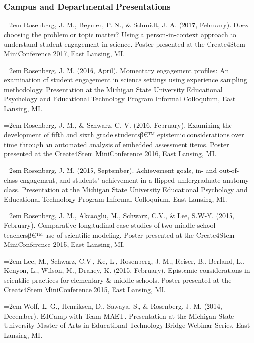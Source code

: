 \documentclass[]{article}
\newcommand{\euro}{€}
\begin{document}
\subsubsection{Campus and Departmental
Presentations}\label{campus-and-departmental-presentations}

\hangindent=2em Rosenberg, J. M., Beymer, P. N., \& Schmidt, J. A.
(2017, February). Does choosing the problem or topic matter? Using a
person-in-context approach to understand student engagement in science.
Poster presented at the Create4Stem MiniConference 2017, East Lansing,
MI.

\hangindent=2em Rosenberg, J. M. (2016, April). Momentary engagement
profiles: An examination of student engagement in science settings using
experience sampling methodology. Presentation at the Michigan State
University Educational Psychology and Educational Technology Program
Informal Colloquium, East Lansing, MI.

\hangindent=2em Rosenberg, J. M., \& Schwarz, C. V. (2016, February).
Examining the development of fifth and sixth grade studentsβ\euro{}™
epistemic considerations over time through an automated analysis of
embedded assessment items. Poster presented at the Create4Stem
MiniConference 2016, East Lansing, MI.

\hangindent=2em Rosenberg, J. M. (2015, September). Achievement goals,
in- and out-of-class engagement, and students' achievement in a flipped
undergraduate anatomy class. Presentation at the Michigan State
University Educational Psychology and Educational Technology Program
Informal Colloquium, East Lansing, MI.

\hangindent=2em Rosenberg, J. M., Akcaoglu, M., Schwarz, C.V., \& Lee,
S.W-Y. (2015, February). Comparative longitudinal case studies of two
middle school teachersβ\euro{}™ use of scientific modeling. Poster
presented at the Create4Stem MiniConference 2015, East Lansing, MI.

\hangindent=2em Lee, M., Schwarz, C.V., Ke, L., Rosenberg, J. M.,
Reiser, B., Berland, L., Kenyon, L., Wilson, M., Draney, K. (2015,
February). Epistemic considerations in scientific practices for
elementary \& middle schools. Poster presented at the Create4Stem
MiniConference 2015, East Lansing, MI.

\hangindent=2em Wolf, L. G., Henriksen, D., Sawaya, S., \& Rosenberg, J.
M. (2014, December). EdCamp with Team MAET. Presentation at the Michigan
State University Master of Arts in Educational Technology Bridge Webinar
Series, East Lansing, MI.
\end{document}
